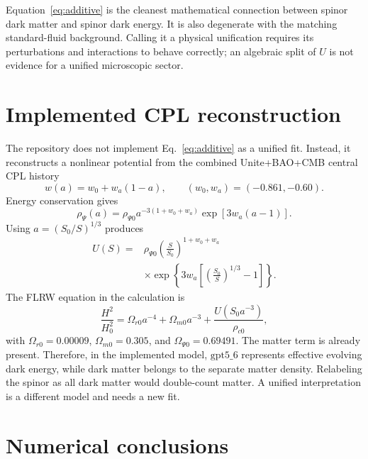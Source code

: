 \documentclass[11pt]{article}
\newcommand{\gptfield}{\ensuremath{\mathrm{gpt5\_6}}}
\begin{document}
Equation~\eqref{eq:additive} is the cleanest mathematical connection between
spinor dark matter and spinor dark energy.  It is also degenerate with the
matching standard-fluid background.  Calling it a physical unification
requires its perturbations and interactions to behave correctly; an algebraic
split of $U$ is not evidence for a unified microscopic sector.

\section{Implemented CPL reconstruction}

The repository does not implement Eq.~\eqref{eq:additive} as a unified fit.
Instead, it reconstructs a nonlinear potential from the combined
Unite+BAO+CMB central CPL history \cite{camilleri,chevallier,linder}
\begin{equation}
  w(a)=w_0+w_a(1-a),
  \qquad (w_0,w_a)=(-0.861,-0.60).
  \label{eq:cpl}
\end{equation}
Energy conservation gives
\begin{equation}
  \rho_\Psi(a)=\rho_{\Psi0}
  a^{-3(1+w_0+w_a)}
  \exp\left[3w_a(a-1)\right].
  \label{eq:cpldensity}
\end{equation}
Using $a=(S_0/S)^{1/3}$ produces
\begin{equation}
\begin{split}
  U(S)={}&\rho_{\Psi0}
  \left(\frac{S}{S_0}\right)^{1+w_0+w_a}\\
  &\times\exp\left\{3w_a\left[
  \left(\frac{S_0}{S}\right)^{1/3}-1
  \right]\right\}.
\end{split}
\label{eq:reconstructed}
\end{equation}
The FLRW equation in the calculation is
\begin{equation}
  \frac{H^2}{H_0^2}
  =\Omega_{r0}a^{-4}+\Omega_{m0}a^{-3}
  +\frac{U(S_0a^{-3})}{\rho_{c0}},
  \label{eq:friedmann}
\end{equation}
with $\Omega_{r0}=0.00009$, $\Omega_{m0}=0.305$, and
$\Omega_{\Psi0}=0.69491$.  The matter term is already present.  Therefore,
in the implemented model, \gptfield{} represents effective evolving dark
energy, while dark matter belongs to the separate matter density.  Relabeling
the spinor as all dark matter would double-count matter.  A unified
interpretation is a different model and needs a new fit.

\section{Numerical conclusions}
\end{document}
